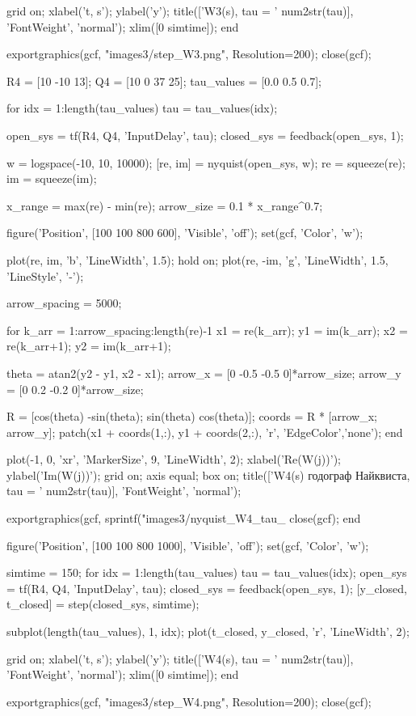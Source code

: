 \begin{matlabcode}
    grid on;
    xlabel('t, s');
    ylabel('y');
    title(['W3(s), tau = ' num2str(tau)], 'FontWeight', 'normal');
    xlim([0 simtime]);
end

exportgraphics(gcf, "images3/step_W3.png", Resolution=200);
close(gcf);

R4 = [10 -10 13];
Q4 = [10 0 37 25];
tau_values = [0.0 0.5 0.7];

for idx = 1:length(tau_values)
    tau = tau_values(idx);
    
    open_sys = tf(R4, Q4, 'InputDelay', tau);
    closed_sys = feedback(open_sys, 1);
    
    w = logspace(-10, 10, 10000);
    [re, im] = nyquist(open_sys, w);
    re = squeeze(re);
    im = squeeze(im);
    
    x_range = max(re) - min(re);
    arrow_size = 0.1 * x_range^0.7;
    
    figure('Position', [100 100 800 600], 'Visible', 'off');
    set(gcf, 'Color', 'w');
    
    plot(re, im, 'b', 'LineWidth', 1.5);
    hold on;
    plot(re, -im, 'g', 'LineWidth', 1.5, 'LineStyle', '-');
    
    arrow_spacing = 5000;
    
    for k_arr = 1:arrow_spacing:length(re)-1
        x1 = re(k_arr);
        y1 = im(k_arr);
        x2 = re(k_arr+1);
        y2 = im(k_arr+1);
        
        theta = atan2(y2 - y1, x2 - x1);
        arrow_x = [0 -0.5 -0.5 0]*arrow_size;
        arrow_y = [0 0.2 -0.2 0]*arrow_size;
        
        R = [cos(theta) -sin(theta); sin(theta) cos(theta)];
        coords = R * [arrow_x; arrow_y];
        patch(x1 + coords(1,:), y1 + coords(2,:), 'r', 'EdgeColor','none');
    end
    
    plot(-1, 0, 'xr', 'MarkerSize', 9, 'LineWidth', 2);
    xlabel('Re(W(j\omega))');
    ylabel('Im(W(j\omega))');
    grid on;
    axis equal;
    box on;
    title(['W4(s) годограф Найквиста, tau = ' num2str(tau)], 'FontWeight', 'normal');
    
    exportgraphics(gcf, sprintf("images3/nyquist_W4_tau_%
    close(gcf);
end

figure('Position', [100 100 800 1000], 'Visible', 'off');
set(gcf, 'Color', 'w');

simtime = 150;
for idx = 1:length(tau_values)
    tau = tau_values(idx);
    open_sys = tf(R4, Q4, 'InputDelay', tau);
    closed_sys = feedback(open_sys, 1);
    [y_closed, t_closed] = step(closed_sys, simtime);
    
    subplot(length(tau_values), 1, idx);
    plot(t_closed, y_closed, 'r', 'LineWidth', 2);
    
    grid on;
    xlabel('t, s');
    ylabel('y');
    title(['W4(s), tau = ' num2str(tau)], 'FontWeight', 'normal');
    xlim([0 simtime]);
end

exportgraphics(gcf, "images3/step_W4.png", Resolution=200);
close(gcf);

\end{matlabcode}
